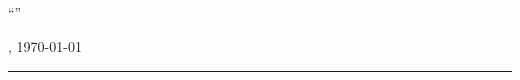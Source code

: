 \thispagestyle{empty}

\section*{\langrestrictionnotice}

\langrestrictionnoticetext \\\\
\enquote{\langrestrictionnoticequote}

\vfill

\mysubmissionLocation, \today
\vspace{4em}

\rule{6cm}{0.4pt}\\
\myauthor

